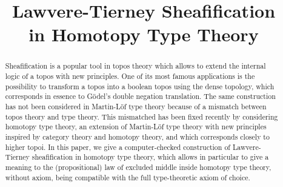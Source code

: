 \documentclass[conference]{IEEEtran}
\begin{document}
%
\title{Lawvere-Tierney Sheafification\\ in Homotopy Type Theory}


\author{
}



\maketitle

\begin{abstract}

  Sheafification is a popular tool in topos theory which
  allows to extend the internal logic of a topos with new
  principles. One of its most famous applications is the possibility
  to transform a topos into a boolean topos using the
  dense topology, which corresponds in essence to Gödel's double
  negation translation.
  The same construction has not been considered in Martin-Löf type
  theory because of a mismatch between topos theory and type theory. This
  mismatched has been fixed recently by considering homotopy type
  theory, an extension of Martin-Löf type theory with new
  principles inspired by category theory and homotopy theory, and
  which corresponds closely to higher topoi.
  In this paper, we give a computer-checked construction of
  Lawvere-Tierney sheafification in homotopy type theory, which allows
  in particular to give a meaning to the (propositional) law of
  excluded middle inside homotopy type theory, without axiom, being
  compatible with the full type-theoretic axiom of choice.
  
\end{abstract}
\end{document}

